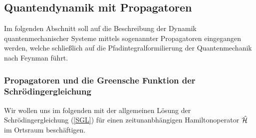 %
%
%

\subsection{Quantendynamik mit Propagatoren}
Im folgenden Abschnitt soll auf die Beschreibung der Dynamik quantenmechanischer Systeme mittels sogenannter Propagatoren eingegangen werden, welche schließlich auf die Pfadintegralformilierung der Quantenmechanik nach Feynman führt. 

\subsubsection{Propagatoren und die Greensche Funktion der Schrödingergleichung}
Wir wollen uns im folgenden mit der allgemeinen Lösung der Schrödingergleichung (\ref{SGL}) für einen zeitunanbhängigen Hamiltonoperator $\hat{\mathcal H}$ im Ortsraum beschäftigen. 

